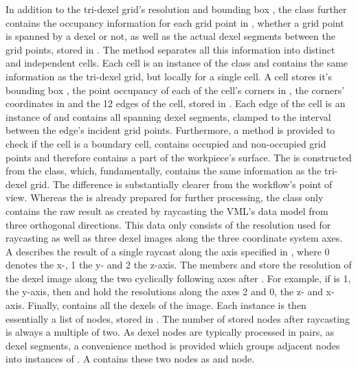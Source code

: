 In addition to the tri-dexel grid's resolution  and bounding box , the  class further contains the occupancy information for each grid point in , \ie whether a grid point is spanned by a dexel or not, as well as the actual dexel segments between the grid points, stored in .
The  method separates all this information into distinct and independent cells.
Each cell is an instance of the  class and contains the same information as the tri-dexel grid, but locally for a single cell.
A cell stores it's bounding box , the point occupancy of each of the cell's corners in , the corners' coordinates in  and the 12 edges of the cell, stored in .
Each edge of the cell is an instance of  and contains all spanning dexel segments, clamped to the interval between the edge's incident grid points.
Furthermore, a method  is provided to check if the cell is a boundary cell, \ie contains occupied and non-occupied grid points and therefore contains a part of the workpiece's surface.
The  is constructed from the  class, which, fundamentally, contains the same information as the tri-dexel grid.
The difference is substantially clearer from the workflow's point of view.
Whereas the  is already prepared for further processing, the  class only contains the raw result as created by raycasting the VML's data model from three orthogonal directions.
This data only consists of the resolution  used for raycasting as well as three dexel images  along the three coordinate system axes.
A  describes the result of a single raycast along the axis specified in , where 0 denotes the x-, 1 the y- and 2 the z-axis.
The members  and  store the resolution of the dexel image along the two cyclically following axes after .
For example, if  is 1, the y-axis, then  and  hold the resolutions along the axes 2 and 0, the z- and x-axis.
Finally,  contains all the dexels of the image.
Each  instance is then essentially a list of nodes, stored in .
The number of stored nodes after raycasting is always a multiple of two.
As dexel nodes are typically processed in pairs, as dexel segments, a convenience method  is provided which groups adjacent nodes into instances of .
A  contains these two nodes as  and  node.
